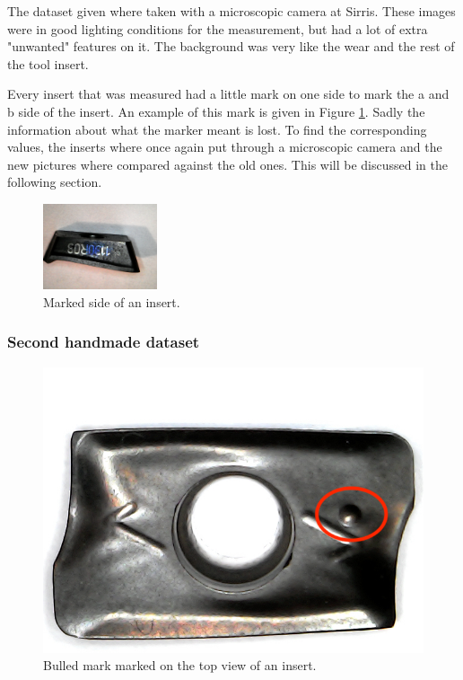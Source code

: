 
The dataset given where taken with a microscopic camera at Sirris. These images were in good lighting conditions for the measurement, but had a lot of extra "unwanted" features on it. The background was very like the wear and the rest of the tool insert. 

Every insert that was measured had a little mark on one side to mark the a and b side of the insert. An example of this mark is given in Figure \ref{fig:impl:va:do:mark}. Sadly the information about what the marker meant is lost. To find the corresponding values, the inserts where once again put through a microscopic camera and the new pictures where compared against the old ones. This will be discussed in the following section.

\begin{figure}[hbtp]
\centering
\includegraphics[width=0.3\textwidth]{fig/algemeen/plaatjes/plaatje/marked_side.jpg}
\caption{Marked side of an insert.}
\label{fig:impl:va:do:mark}
\end{figure}

			
		\subsubsection{Second handmade dataset}
		\label{sec:impl:ds:shm}
		
		
		
\begin{figure}[hbtp]
			\centering
			\includegraphics[width=.49\textwidth]{fig/algemeen/plaatjes/plaatje/top_view_bullet_marked.jpg}
			\caption{Bulled mark marked on the top view of an insert.}
			\label{fig:impl:va:do:bullet}
		\end{figure}

